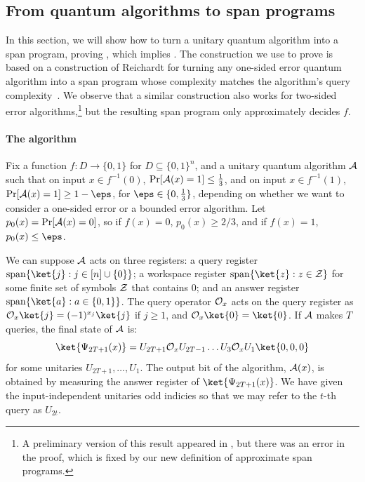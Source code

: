 \documentclass[11pt]{article}
\numberwithin{equation}{section}
\theoremstyle{definition}
\theoremstyle{plain}
\begin{document}
\subsection{From quantum algorithms to span programs}\label{sec:alg-to-span}

In this section, we will show how to turn a unitary quantum algorithm into a span program, proving , which implies . 
The construction we use to prove  is based on a construction of Reichardt for turning any one-sided error quantum algorithm into a span program whose complexity matches the algorithm's query complexity~\cite[arXiv version]{Rei09}. We observe that a similar construction also works for two-sided error algorithms,\footnote{A preliminary version of this result appeared in \cite{Jef14}, but there was an error in the proof, which is fixed by our new definition of approximate span programs.} but the resulting span program only approximately decides $f$. 

\paragraph{The algorithm} Fix a function $f:D\rightarrow \{0,1\}$ for $D\subseteq \{0,1\}^n$, and a unitary quantum algorithm ${\cal A}$ such that on input $x\in f^{-1}(0)$, $\Pr[{\cal A}(x)=1]\leq\frac{1}{3}$, and on input $x\in f^{-1}(1)$, $\Pr[{\cal A}(x)=1]\geq 1-\eps$, for $\eps\in\{0,\frac{1}{3}\}$, depending on whether we want to consider a one-sided error or a bounded error algorithm. Let $p_0(x)=\Pr[{\cal A}(x)=0]$, so if $f(x)=0$, $p_0(x)\geq 2/3$, and if $f(x)=1$, $p_0(x)\leq \eps$. 

We can suppose ${\cal A}$ acts on three registers: a query register $\mathrm{span}\{\ket{j}:j\in[n]\cup\{0\}\}$; a workspace register $\mathrm{span}\{\ket{z}:z\in{\cal Z}\}$ for some finite set of symbols ${\cal Z}$ that contains 0; and an answer register $\mathrm{span}\{\ket{a}:a\in\{0,1\}\}$. The query operator ${\cal O}_x$ acts on the query register as ${\cal O}_x\ket{j}=(-1)^{x_j}\ket{j}$ if $j\geq 1$, and ${\cal O}_x\ket{0}=\ket{0}$. If ${\cal A}$ makes $T$ queries, the final state of ${\cal A}$ is: 
$$\ket{\Psi_{2T+1}(x)}=U_{2T+1}{\cal O}_x U_{2T-1}\dots U_3{\cal O}_x U_1\ket{0,0,0}$$
for some unitaries $U_{2T+1},\dots,U_1$. The output bit of the algorithm, ${\cal A}(x)$, is obtained by measuring the answer register of $\ket{\Psi_{2T+1}(x)}$.  We have given the input-independent unitaries odd indicies so that we may refer to the $t$-th query as $U_{2t}$. 
\end{document}
